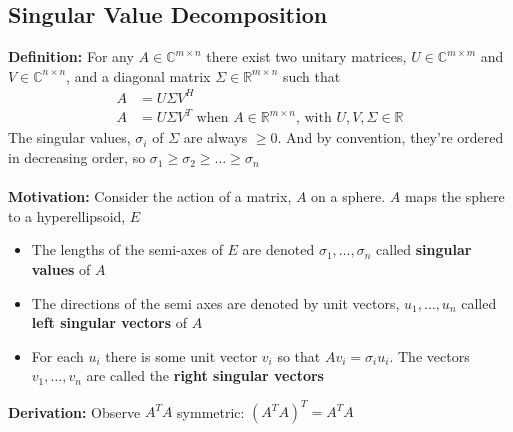 \documentclass{article}
\begin{document}
\subsection{Singular Value Decomposition}
\textbf{Definition:} For any $A \in \mathbb{C}^{m\times n}$ there exist two unitary matrices, $U \in \mathbb{C}^{m \times m}$ and $V \in \mathbb{C}^{n \times n}$, and a diagonal matrix $\Sigma \in \mathbb{R}^{m \times n}$ such that
\begin{align*}
    A &= U\Sigma V^H \\
    A &= U\Sigma V^T \textrm{ when } A \in \mathbb{R}^{m \times n} \textrm{, with } U, V, \Sigma \in \mathbb{R}
\end{align*}
The singular values, $\sigma_i$ of $\Sigma$ are always $\geq0$. And by convention, they're ordered in decreasing order, so $\sigma_1 \geq \sigma_2 \geq \dots \geq \sigma_n$ \\ \\
\textbf{Motivation:} Consider the action of a matrix, $A$ on a sphere. $A$ maps the sphere to a hyperellipsoid, $E$
\begin{itemize}
    \item The lengths of the semi-axes of $E$ are denoted $\sigma_1, \dots, \sigma_n$ called \textbf{singular values} of $A$
    \item The directions of the semi axes are denoted by unit vectors, $u_1, \dots, u_n$ called \textbf{left singular vectors} of $A$
    \item For each $u_i$ there is some unit vector $v_i$ so that $Av_i = \sigma_iu_i$. The vectors $v_1, \dots, v_n$ are called the \textbf{right singular vectors}
\end{itemize}
\textbf{Derivation:}
Observe $A^TA$ symmetric: $(A^TA)^T = A^TA$
\end{document}
